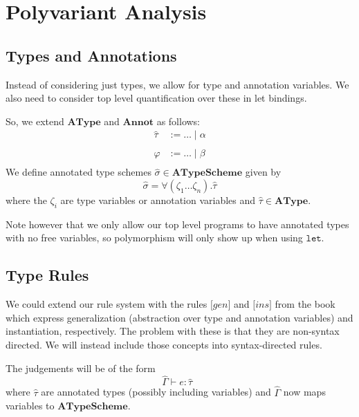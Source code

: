 \documentclass[a4wide,12pt]{article}
\theoremstyle{definition}
\theoremstyle{plain}
\theoremstyle{remark}
\def\AType{\mathbf{AType}}
\def\Annot{\mathbf{Annot}}
\def\ATypeScheme{\mathbf{ATypeScheme}}
\def\htau{\hat{\tau}}
\def\hsigma{\hat{\sigma}}
\def\HGamma{\hat{\Gamma}}
\def\judge#1#2#3{#1 \vdash #2 : #3\;\;}
\begin{document}
\section{Polyvariant Analysis}

\subsection{Types and Annotations}

Instead of considering just types, we allow for type and annotation variables.
We also need to consider
top level quantification
over these in let bindings. 

So, we extend $\AType$ and $\Annot$ as follows:
\begin{eqnarray*}
\htau & := \ldots  \mid \alpha \\ 
\\
\varphi & := \ldots  \mid \beta \\
\end{eqnarray*}
We define annotated type schemes $\hsigma \in \ATypeScheme$ given by
\[\hsigma = \forall (\zeta_1 \ldots \zeta_n). \htau\]
where the $\zeta_i$ are type variables or annotation variables and $\htau \in \AType$.

Note however that we only allow our top level
programs to have annotated types with no free variables, so polymorphism will only show up when using $\texttt{let}$.

\subsection{Type Rules}

We could extend our rule system with the rules
$\lbrack gen \rbrack$ and $\lbrack ins \rbrack$
from the book which
express generalization (abstraction over type and annotation variables) and
instantiation, respectively.
The problem with these is that they are 
non-syntax directed.
We will instead include those concepts into  syntax-directed rules.

The judgements will be of the form
\[\judge{\HGamma}{e}{\htau}\]
where $\htau$ are annotated types (possibly including variables)
and $\HGamma$ now maps variables
to $\ATypeScheme$.
\end{document}
